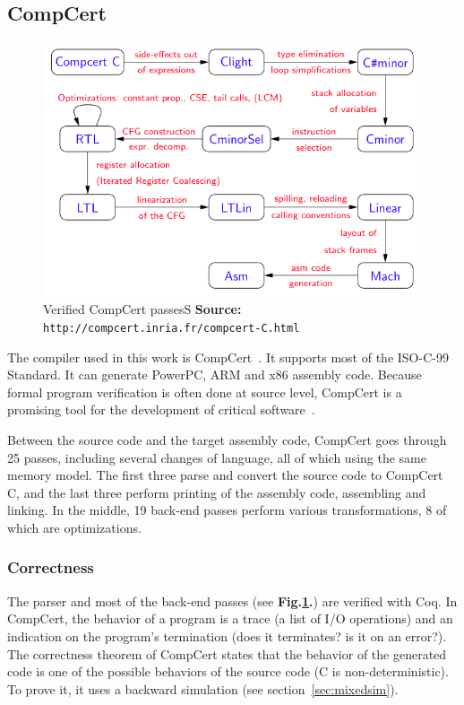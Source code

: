 \subsection{CompCert}
\begin{center}
\begin{figure}
\includegraphics[scale=1]{img/passes.png}
\caption{Verified CompCert passes\hspace{\linewidth}S \textbf{Source: }\texttt{http://compcert.inria.fr/compcert-C.html}}
\label{fig:compcertpasses}
\end{figure}
\end{center}

The compiler used in this work is CompCert~\cite{compcertmanual}.
It supports most of the ISO-C-99 Standard.
It can generate PowerPC, ARM and x86 assembly code.
Because formal program verification is often done at source level, CompCert is a promising tool for the development of critical software~\cite{bedinfranca:hal-00653367}.

Between the source code and the target assembly code, CompCert goes through 25 passes, including several changes of language, all of which using the same memory model.
The first three parse and convert the source code to CompCert C, and the last three perform printing of the assembly code, assembling and linking.
In the middle, 19 back-end passes perform various transformations, 8 of which are optimizations.

\subsubsection{Correctness}
The parser and most of the back-end passes (see \textbf{Fig.\ref{fig:compcertpasses}.}) are verified with Coq.
In CompCert, the behavior of a program is a trace (a list of I/O operations) and an indication on the program's termination (does it terminates? is it on an error?). %
The correctness theorem of CompCert states that the behavior of the generated code is one of the possible behaviors of the source code (C is non-deterministic). To prove it, it uses a backward simulation (see section~\ref{sec:mixedsim}).

